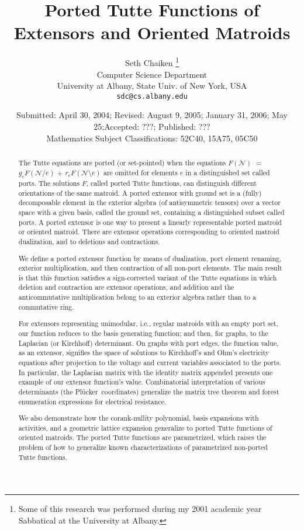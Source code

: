 \documentclass[12pt]{article}
\title{Ported Tutte Functions of Extensors and Oriented Matroids}
\author{Seth Chaiken
\thanks{Some of this research was 
performed during my 2001 academic year 
Sabbatical at the University at Albany.}\\
\small Computer Science Department\\[-0.8ex]
\small University at Albany, State Univ. of New York, USA\\[-0.8ex]
\small \texttt{sdc@cs.albany.edu}
}
\date{
\small \comment{Formatted:\today/ } Submitted: April 30, 2004;  
Revised: August 9, 2005; January 31, 2006; May 25;Accepted: ???;
 Published: ???\\
\small Mathematics Subject Classifications: 52C40, 15A75, 05C50}
\theoremstyle{definition}
\newcommand{\Plucker}{Pl\"{u}cker\ }
\begin{document}
\maketitle

\begin{abstract}
The Tutte equations are ported (or set-pointed) when the equations
$F(\mathcal{N})$ $=$ $g_eF(\mathcal{N}/e)$ $+$ 
$r_eF(\mathcal{N}\setminus e)$ are 
omitted for elements $e$ in a distinguished set
called ports.
The solutions $F$, called ported Tutte
functions, can distinguish different orientations of the same matroid. 
A ported extensor with ground set is a (fully) decomposable element
in the exterior algebra (of antisymmetric tensors) over a vector space with
a given basis, called the ground set, containing a distinguished subset 
called ports.  A ported extensor is one way to present a linearly 
representable ported matroid or oriented matroid.  There are extensor operations
corresponding to oriented matroid dualization, and to deletions and
contractions.

We define a ported extensor function by means of dualization, 
port element renaming, exterior multiplication, 
and then contraction of all non-port elements.  The main result is
that this function  satisfies 
a sign-corrected variant of the Tutte equations in which deletion
and contraction are extensor operations, and addition and 
the anticommutative multiplication belong to an exterior algebra
rather than to a commutative ring.

For extensors representing unimodular, i.e., regular
matroids with an empty port set, our function reduces to the basis
generating function; and then, for graphs, to the Laplacian (or
Kirchhoff) determinant.  On graphs with port edges, the function
value, as an extensor, signifies the space of solutions to Kirchhoff's
and Ohm's electricity equations after projection to the voltage and
current variables associated to the ports.  
In
particular, the Laplacian matrix with the identity matrix appended 
presents one example of our extensor function's value.  
Combinatorial interpretation
of various determinants (the \Plucker coordinates) generalize 
the matrix tree theorem and forest enumeration expressions for 
electrical resistance.  

We also demonstrate how the corank-nullity polynomial, basis expansions
with activities, and a geometric lattice expansion generalize to 
ported Tutte functions of oriented matroids.  The ported 
Tutte functions are parametrized, which raises 
the problem of how to generalize known characterizations
of parametrized non-ported Tutte functions.
\end{abstract}
\end{document}
